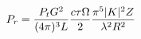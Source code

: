 \documentclass[preview]{standalone}
\begin{document}
\begin{align*}
\special{dvisvgm:raw <g id='unique000'>}P_r = \frac{P_t G^2}{(4 \pi)^3 L} \frac{c \tau \Omega}{2} \frac{\pi^5 |K|^2 Z}{\lambda^2 R^2}\special{dvisvgm:raw </g>}
\end{align*}
\end{document}
